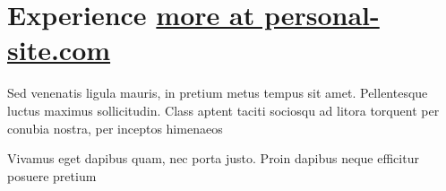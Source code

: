 \documentclass[letterpaper,12pt]{werner} %
\begin{document}
\section{Experience \hfill \small{\href{https://github.com/}{more at personal-site.com}}}
\begin{minipage}[t]{0.76\textwidth}


\end{minipage}
\hfill
\begin{minipage}[t]{0.19\textwidth}
\begin{flushright}

{}

\end{flushright}
\end{minipage}
\vspace{1pt}
\begin{justify}
Sed venenatis ligula mauris, in pretium metus tempus sit amet. Pellentesque luctus maximus sollicitudin. Class aptent taciti sociosqu ad litora torquent per conubia nostra, per inceptos himenaeos
\end{justify}
\vspace{-3pt}


\begin{minipage}[t]{0.78\textwidth}


\end{minipage}
\hfill
\begin{minipage}[t]{0.2\textwidth}
\begin{flushright}

{}

\end{flushright}
\end{minipage}
\vspace{0pt}
\begin{justify}
Vivamus eget dapibus quam, nec porta justo. Proin dapibus neque efficitur posuere pretium
\end{justify}
\vspace{-3pt}

\end{document}
